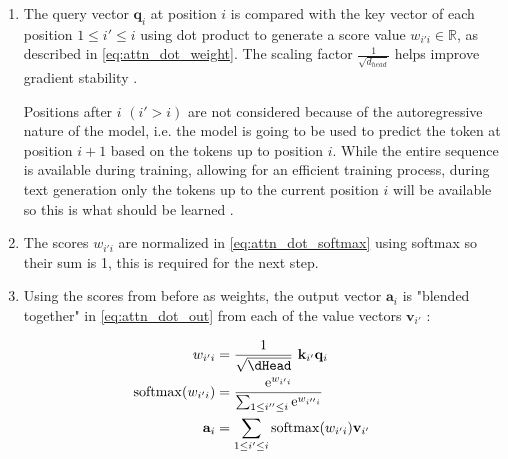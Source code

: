 \begin{enumerate}
\item The query vector $\mathbf{q}_i$ at position $i$ is compared with the key vector of each position $1 \leq i' \leq i$ using dot product to generate a score value $w_{i'i} \in \mathbb{R}$, as described in \cref{eq:attn_dot_weight}.
The scaling factor $\frac {1} {\sqrt{d_{head}}}$ helps improve gradient stability .

Positions after $i$ $(i' > i)$ are not considered because of the autoregressive nature of the model, i.e. the model is going to be used to predict the token at position $i+1$ based on the tokens up to position $i$. While the entire sequence is available during training, allowing for an efficient training process, during text generation only the tokens up to the current position $i$ will be available so this is what should be learned .

\item The scores $w_{i'i}$ are normalized in \cref{eq:attn_dot_softmax} using softmax so their sum is 1, this is required for the next step.

\item Using the scores from before as weights, the output vector $\mathbf{a}_i$ is "blended together" in \cref{eq:attn_dot_out} from each of the value vectors $\mathbf{v}_{i'}$ \cite{alammar-gpt2}:
\end{enumerate}

\begin{align}
	w_{i'i} &= \frac{1}{\sqrt{\dHead}} \ \mathbf{k}_{i'} \mathbf{q}_i
	\label{eq:attn_dot_weight}
	\\
	\operatorname{softmax}(w_{i'i}) &= \frac{\mathrm{e}^{w_{i'i}}} {\sum_{1 \leq i'' \leq i} \mathrm{e}^{w_{i''i}} }
	\label{eq:attn_dot_softmax}
	\\
	\mathbf{a}_i &= \sum _{1 \leq i' \leq i} \operatorname{softmax}(w_{i'i}) \mathbf{v}_{i'}
	\label{eq:attn_dot_out}
\end{align}



